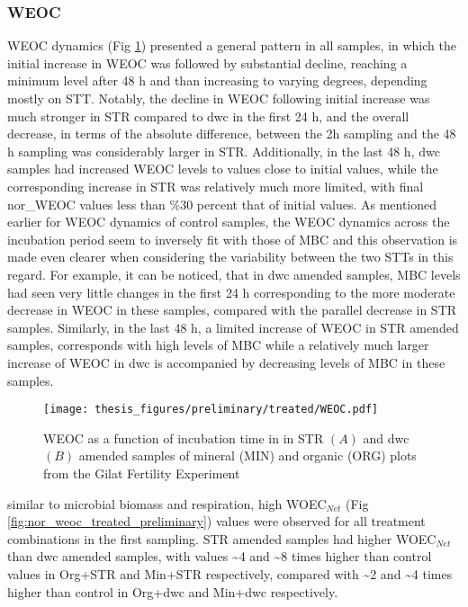 \documentclass[12pt]{report}
\begin{document}
		
		
		\subsubsection{WEOC}
		WEOC dynamics (Fig \ref{fig:weoc_treated_preliminary}) presented a general pattern in all samples, in which the initial increase in WEOC was followed by substantial decline, reaching a minimum level after 48 h and than increasing to varying degrees, depending mostly on STT.  Notably, the decline in WEOC following initial increase was much stronger in STR compared to \gls{dwc} in the first 24 h, and the overall decrease, in terms of the absolute difference, between the 2h sampling and the 48 h sampling was considerably larger in STR. Additionally, in the last 48 h, \gls{dwc} samples had increased WEOC levels to values close to initial values, while the corresponding increase in STR was relatively much more limited, with final nor\_WEOC values less than \%30 percent that of initial values. As mentioned earlier for WEOC dynamics of control samples, the WEOC dynamics across the incubation period seem to inversely fit with those of MBC and this observation is made even clearer when considering the variability between the two STTs in this regard. For example, it can be noticed, that in \gls{dwc} amended samples, MBC levels had seen very little changes in the first 24 h corresponding to the more moderate decrease in WEOC in these samples, compared with the parallel  decrease in STR samples. Similarly, in the last 48 h, a limited increase of WEOC in STR amended samples, corresponds with high levels of MBC while a relatively much larger increase of WEOC in \gls{dwc} is accompanied by decreasing levels of MBC in these samples.
		\begin{figure}[H]
			\centering
			\texttt{[image: thesis\_figures/preliminary/treated/WEOC.pdf]}
			\caption{WEOC  as a function of incubation time in in STR $\left(A\right)$ and \gls{dwc} $\left(B\right)$ amended samples of mineral (MIN) and organic (ORG) plots from the Gilat Fertility Experiment}
			\label{fig:weoc_treated_preliminary}
		\end{figure}
		similar to microbial biomass and respiration, high WOEC$_{Net}$ (Fig \ref{fig:nor_weoc_treated_preliminary}) values were observed for all treatment combinations in the first sampling. STR amended samples had higher WOEC$_{Net}$ than \gls{dwc} amended samples, with values  \~{}4 and \~{}8 times higher than control values in Org+STR and Min+STR respectively, compared with \~{}2 and \~{}4 times higher than control in Org+\gls{dwc} and Min+\gls{dwc} respectively.
		
\end{document}
